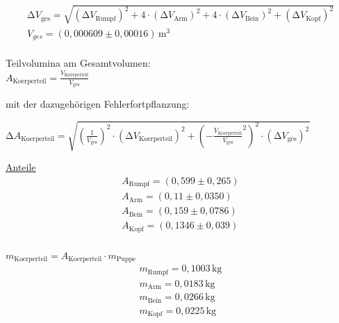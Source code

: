 \begin{center}
    \begin{align*}
     \increment V_{\text{ges}} = \sqrt{(\increment V_{\text{Rumpf}})^2 + 4 \cdot (\increment V_{\text{Arm}})^2 +4 \cdot (\increment V_{\text{Bein}})^2 + (\increment V_{\text{Kopf}})^2}  \\
     V_{ges} = (0,000609 \pm 0,00016)\, \unit{\meter^3} \\
    \end{align*}

    Teilvolumina am Gesamtvolumen: \\ 

   

    $ A_{\text{Koerperteil}} = \frac{V_{\text{Koerperteil}}}{V_{\text{ges}}} $ \\

    \vspace{0.3cm}

    mit der dazugehörigen Fehlerfortpflanzung: \\

    \vspace{0.3cm}

    $ \increment A_{\text{Koerperteil}} = \sqrt{ \left(\frac{1}{V_{\text{ges}}}\right)^2 \cdot (\increment V_{\text{Koerperteil}})^2 + \left( -\frac{V_{\text{Koerperteil}}}{V_{\text{ges}}}^2  \right)^2 \cdot (\increment V_{\text{ges}})^2}$

    \vspace{0.7cm}

    \underline{Anteile} \\    

    \begin{align*}
     A_{\text{Rumpf}} = (0,599 \pm 0,265)   \\
     A_{\text{Arm}}   = (0,11 \pm 0,0350)   \\
     A_{\text{Bein}}  = (0,159 \pm 0,0786)  \\
     A_{\text{Kopf}}  = (0,1346 \pm 0,039)  \\
    \end{align*}

    $ m_{\text{Koerperteil}} = A_{\text{Koerperteil}} \cdot m_{\text{Puppe}} $ \\

    \begin{align*}
     m_{\text{Rumpf}} = 0,1003\, \unit{\kilogram}  \\
     m_{\text{Arm}} = 0,0183\, \unit{\kilogram}  \\ 
     m_{\text{Bein}} = 0,0266\, \unit{\kilogram}  \\
     m_{\text{Kopf}} = 0,0225\, \unit{\kilogram}  \\
    \end{align*}
\end{center}

